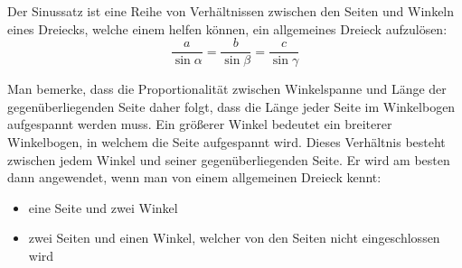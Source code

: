 
Der Sinussatz ist eine Reihe von Verh\"{a}ltnissen zwischen den Seiten und Winkeln eines Dreiecks, welche einem helfen k\"{o}nnen, ein allgemeines Dreieck aufzul\"{o}sen: $$\frac{a}{\sin \alpha} = \frac{b}{\sin \beta} = \frac{c}{\sin \gamma}$$

Man bemerke, dass die Proportionalit\"{a}t zwischen Winkelspanne und L\"{a}nge der gegen\"{u}berliegenden Seite daher folgt, dass die L\"{a}nge jeder Seite im Winkelbogen aufgespannt werden muss. Ein gr\"{o}\ss{}erer Winkel bedeutet ein breiterer Winkelbogen, in welchem die Seite aufgespannt wird. Dieses Verh\"{a}ltnis besteht zwischen jedem Winkel und seiner gegen\"{u}berliegenden Seite. Er wird am besten dann angewendet, wenn man von einem allgemeinen Dreieck kennt:
\begin{itemize}
	\item eine Seite und zwei Winkel
	\item zwei Seiten und einen Winkel, welcher von den Seiten nicht eingeschlossen wird
\end{itemize}

\begin{figure}[h!]
\end{figure}

\pagebreak



